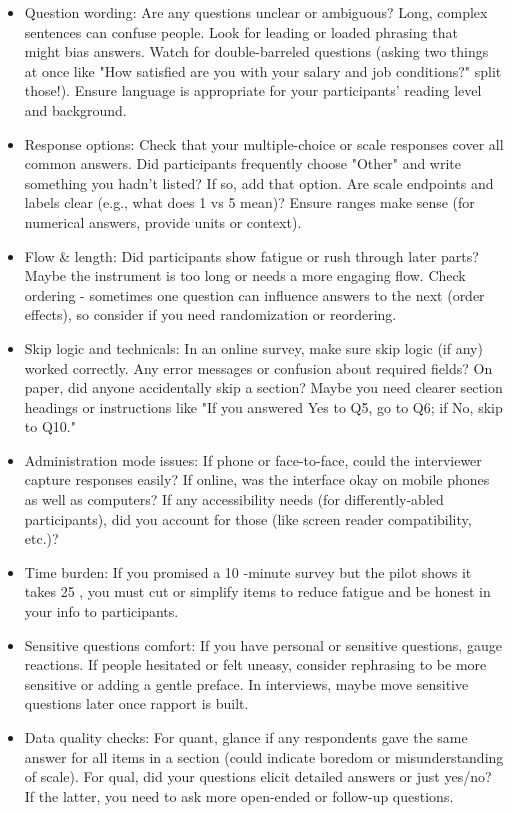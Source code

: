 \documentclass[10pt]{article}
\begin{document}
\begin{itemize}
  \item Question wording: Are any questions unclear or ambiguous? Long, complex sentences can confuse people. Look for leading or loaded phrasing that\\
might bias answers. Watch for double-barreled questions (asking two things at once like "How satisfied are you with your salary and job conditions?" split those!). Ensure language is appropriate for your participants' reading level and background.
  \item Response options: Check that your multiple-choice or scale responses cover all common answers. Did participants frequently choose "Other" and write something you hadn't listed? If so, add that option. Are scale endpoints and labels clear (e.g., what does 1 vs 5 mean)? Ensure ranges make sense (for numerical answers, provide units or context).
  \item Flow \& length: Did participants show fatigue or rush through later parts? Maybe the instrument is too long or needs a more engaging flow. Check ordering - sometimes one question can influence answers to the next (order effects), so consider if you need randomization or reordering.
  \item Skip logic and technicals: In an online survey, make sure skip logic (if any) worked correctly. Any error messages or confusion about required fields? On paper, did anyone accidentally skip a section? Maybe you need clearer section headings or instructions like "If you answered Yes to Q5, go to Q6; if No, skip to Q10."
  \item Administration mode issues: If phone or face-to-face, could the interviewer capture responses easily? If online, was the interface okay on mobile phones as well as computers? If any accessibility needs (for differently-abled participants), did you account for those (like screen reader compatibility, etc.)?
  \item Time burden: If you promised a 10 -minute survey but the pilot shows it takes 25 , you must cut or simplify items to reduce fatigue and be honest in your info to participants.
  \item Sensitive questions comfort: If you have personal or sensitive questions, gauge reactions. If people hesitated or felt uneasy, consider rephrasing to be more sensitive or adding a gentle preface. In interviews, maybe move sensitive questions later once rapport is built.
  \item Data quality checks: For quant, glance if any respondents gave the same answer for all items in a section (could indicate boredom or misunderstanding of scale). For qual, did your questions elicit detailed answers or just yes/no? If the latter, you need to ask more open-ended or follow-up questions.
\end{itemize}
\end{document}
